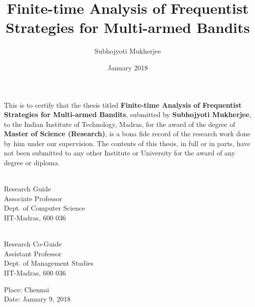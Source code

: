 \documentclass[MS,twoside]{iitmdiss}
\begin{document}

\title{Finite-time Analysis of Frequentist Strategies for Multi-armed Bandits}

\author{Subhojyoti Mukherjee}

\date{January 2018}

\maketitle

\certificate

\vspace*{0.5in}

\noindent This is to certify that the thesis titled {\bf Finite-time Analysis of Frequentist Strategies for Multi-armed Bandits}, submitted by {\bf Subhojyoti Mukherjee}, 
  to the Indian Institute of Technology, Madras, for
the award of the degree of {\bf Master of Science (Research)}, is a bona fide
record of the research work done by him under our supervision.  The
contents of this thesis, in full or in parts, have not been submitted
to any other Institute or University for the award of any degree or
diploma.

\vspace*{1.5in}

\begin{singlespacing}
\hspace*{-0.25in}
\parbox{2.5in}{
 \\
\noindent Research Guide \\ 
\noindent Associate Professor \\
\noindent Dept. of Computer Science\\
\noindent IIT-Madras, 600 036 \\
} 
\hspace*{1.0in} 
\parbox{2.5in}{
 \\
\noindent Research Co-Guide \\ 
\noindent Assistant Professor \\
\noindent Dept.  of  Management Studies\\
\noindent IIT-Madras, 600 036 \\
}  
\end{singlespacing}
\vspace*{0.25in}
\noindent Place: Chennai\\
Date: January 9, 2018
\end{document}
